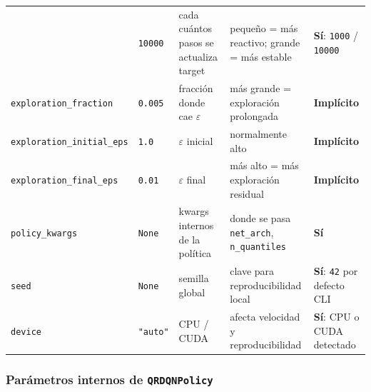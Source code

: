 ﻿\documentclass[12pt,a4paper]{article}
\begin{document}
\begin{table}[htbp]
\begin{tabular}{p{2.8cm}p{1.8cm}p{3cm}p{3.5cm}p{2.5cm}}
  & \texttt{10000}
  & cada cuántos pasos se actualiza target
  & pequeño = más reactivo; grande = más estable
  & \textbf{Sí}: \texttt{1000} / \texttt{10000} \\
\texttt{exploration\_fraction}
  & \texttt{0.005}
  & fracción donde cae \(\varepsilon\)
  & más grande = exploración prolongada
  & \textbf{Implícito} \\
\texttt{exploration\_initial\_eps}
  & \texttt{1.0}
  & \(\varepsilon\) inicial
  & normalmente alto
  & \textbf{Implícito} \\
\texttt{exploration\_final\_eps}
  & \texttt{0.01}
  & \(\varepsilon\) final
  & más alto = más exploración residual
  & \textbf{Implícito} \\
\texttt{policy\_kwargs}
  & \texttt{None}
  & kwargs internos de la política
  & donde se pasa \texttt{net\_arch}, \texttt{n\_quantiles}
  & \textbf{Sí} \\
\texttt{seed}
  & \texttt{None}
  & semilla global
  & clave para reproducibilidad local
  & \textbf{Sí}: \texttt{42} por defecto CLI \\
\texttt{device}
  & \texttt{"auto"}
  & CPU / CUDA
  & afecta velocidad y reproducibilidad
  & \textbf{Sí}: CPU o CUDA detectado \\
\hline
\end{tabular}
\end{table}

\subsubsection{Parámetros internos de \texttt{QRDQNPolicy}}
\end{document}
